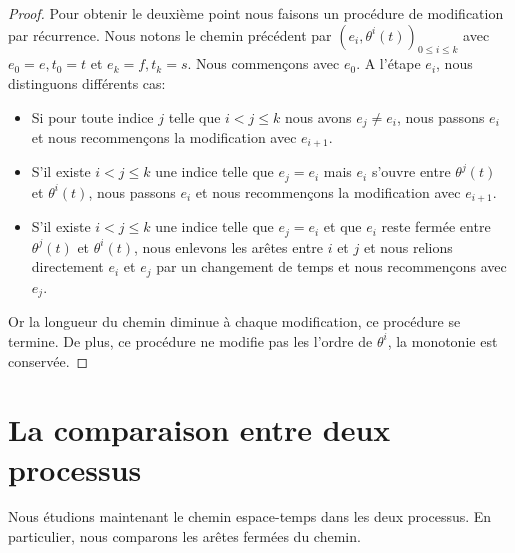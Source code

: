 \documentclass[titlepage,a4paper,12pt]{article}
\newcounter{th}
\begin{document}
\begin{proof}
Pour obtenir le deuxième point nous faisons un procédure de modification par récurrence. Nous notons le chemin précédent par $(e_i,\theta^i(t))_{0\leqslant i \leqslant k}$ avec $e_0 = e,t_0 = t$ et $e_k=f, t_k = s$. Nous commençons avec $e_0$. A l'étape $e_i$, nous distinguons différents cas: 
\begin{itemize}[leftmargin = 0.4cm]
\item Si pour toute indice $j$ telle que $i<j\leqslant k$ nous avons $e_j\neq e_i$, nous passons $e_i$ et nous recommençons la modification avec $e_{i+1}$.
\item S'il existe $i<j\leqslant k$ une indice telle que $e_j=e_i$ mais $e_i$ s'ouvre entre $\theta^j(t)$ et $\theta^i(t)$, nous passons $e_i$ et nous recommençons la modification avec $e_{i+1}$.
\item S'il existe $i<j\leqslant k$ une indice telle que $e_j=e_i$ et que $e_i$ reste fermée entre $\theta^j(t)$ et $\theta^i(t)$, nous enlevons les arêtes entre $i$ et $j$ et nous relions directement $e_i$ et $e_j$ par un changement de temps et nous recommençons avec $e_j$. 
\end{itemize}
Or la longueur du chemin diminue à chaque modification, ce procédure se termine. De plus, ce procédure ne modifie pas les l'ordre de $\theta^i$, la monotonie est conservée.
\end{proof}

\section{La comparaison entre deux processus}
Nous étudions maintenant le chemin espace-temps dans les deux processus. En particulier, nous comparons les arêtes fermées du chemin.
\end{document}
